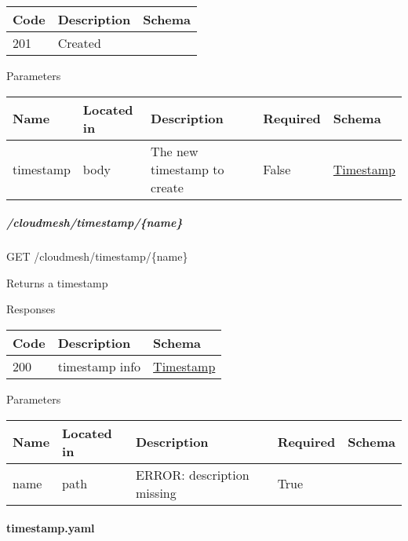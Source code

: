 \documentclass[9pt,]{article}
\let\oldparagraph\paragraph
\renewcommand{\paragraph}[1]{\oldparagraph{#1}\mbox{}}
\let\oldsubparagraph\subparagraph
\renewcommand{\subparagraph}[1]{\oldsubparagraph{#1}\mbox{}}
\begin{document}
\begin{longtable}[]{@{}lll@{}}
\toprule
Code & Description & Schema\tabularnewline
\midrule
\endhead
201 & Created &\tabularnewline
\bottomrule
\end{longtable}

Parameters

\begin{longtable}[]{@{}lllll@{}}
\toprule
Name & Located in & Description & Required & Schema\tabularnewline
\midrule
\endhead
timestamp & body & The new timestamp to create & False &
\protect\hyperlink{timestamp}{Timestamp}\tabularnewline
\bottomrule
\end{longtable}

\hypertarget{cloudmeshtimestampname}{%
\subparagraph{/cloudmesh/timestamp/\{name\}}\label{cloudmeshtimestampname}}

GET /cloudmesh/timestamp/\{name\}

Returns a timestamp

Responses

\begin{longtable}[]{@{}lll@{}}
\toprule
Code & Description & Schema\tabularnewline
\midrule
\endhead
200 & timestamp info &
\protect\hyperlink{timestamp}{Timestamp}\tabularnewline
\bottomrule
\end{longtable}

Parameters

\begin{longtable}[]{@{}lllll@{}}
\toprule
Name & Located in & Description & Required & Schema\tabularnewline
\midrule
\endhead
name & path & ERROR: description missing & True &\tabularnewline
\bottomrule
\end{longtable}

\hypertarget{timestamp.yaml}{%
\paragraph{timestamp.yaml}\label{timestamp.yaml}}
\end{document}
